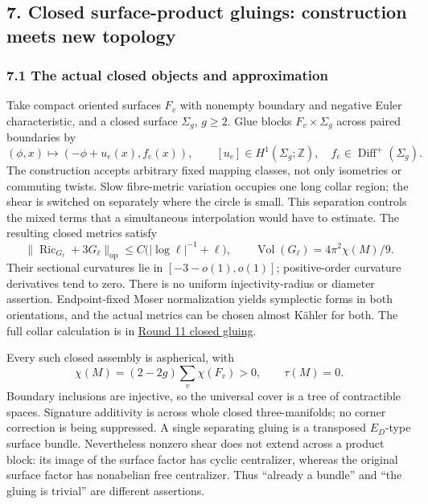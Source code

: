 \documentclass[
  english,
]{article}
\begin{document}
\hypertarget{closed-surface-product-gluings-construction-meets-new-topology}{%
\subsection{7. Closed surface-product gluings: construction meets new
topology}\label{closed-surface-product-gluings-construction-meets-new-topology}}

\hypertarget{the-actual-closed-objects-and-approximation}{%
\subsubsection{7.1 The actual closed objects and
approximation}\label{the-actual-closed-objects-and-approximation}}

Take compact oriented surfaces \(F_v\) with nonempty boundary and
negative Euler characteristic, and a closed surface \(\Sigma_g\),
\(g\ge2\). Glue blocks \(F_v\times\Sigma_g\) across paired boundaries by
\[
 (\phi,x)\longmapsto(-\phi+u_e(x),f_e(x)),
 \qquad [u_e]\in H^1(\Sigma_g;\mathbb Z),\quad f_e\in\operatorname{Diff}^+(\Sigma_g).
\] The construction accepts arbitrary fixed mapping classes, not only
isometries or commuting twists. Slow fibre-metric variation occupies one
long collar region; the shear is switched on separately where the circle
is small. This separation controls the mixed terms that a simultaneous
interpolation would have to estimate. The resulting closed metrics
satisfy \[
 \|\operatorname{Ric}_{G_\ell}+3G_\ell\|_{\mathrm{op}}
 \le C\bigl(|\log\ell|^{-1}+\ell\bigr),\qquad
 \operatorname{Vol}(G_\ell)=4\pi^2\chi(M)/9.
\] Their sectional curvatures lie in \([-3-o(1),o(1)]\); positive-order
curvature derivatives tend to zero. There is no uniform
injectivity-radius or diameter assertion. Endpoint-fixed Moser
normalization yields symplectic forms in both orientations, and the
actual metrics can be chosen almost Kähler for both. The full collar
calculation is in \href{../proofs/round11_closed_gluing.md}{Round 11
closed gluing}.

Every such closed assembly is aspherical, with \[
 \chi(M)=(2-2g)\sum_v\chi(F_v)>0,\qquad \tau(M)=0.
\] Boundary inclusions are injective, so the universal cover is a tree
of contractible spaces. Signature additivity is across whole closed
three-manifolds; no corner correction is being suppressed. A single
separating gluing is a transposed \(E_D\)-type surface bundle.
Nevertheless nonzero shear does not extend across a product block: its
image of the surface factor has cyclic centralizer, whereas the original
surface factor has nonabelian free centralizer. Thus ``already a
bundle'' and ``the gluing is trivial'' are different assertions.
\end{document}

